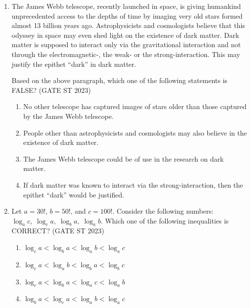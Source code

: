 \documentclass[journal]{IEEEtran}
\begin{document}
\begin{enumerate}[label=\textbf{Q.\arabic*.}, start=1, align=left, itemsep=2em]
\item The James Webb telescope, recently launched in space, is giving humankind unprecedented access to the depths of time by imaging very old stars formed almost 13 billion years ago. Astrophysicists and cosmologists believe that this odyssey in space may even shed light on the existence of dark matter. Dark matter is supposed to interact only via the gravitational interaction and not through the electromagnetic-, the weak- or the strong-interaction. This may justify the epithet ``dark'' in dark matter.

Based on the above paragraph, which one of the following statements is FALSE? \hfill(GATE ST 2023)

\begin{enumerate}
    \item No other telescope has captured images of stars older than those captured by the James Webb telescope.
    \item People other than astrophysicists and cosmologists may also believe in the existence of dark matter.
    \item The James Webb telescope could be of use in the research on dark matter.
    \item If dark matter was known to interact via the strong-interaction, then the epithet ``dark'' would be justified.
\end{enumerate}

\item Let $a = 30!$, $b = 50!$, and $c = 100!$. Consider the following numbers:
$\log_a c,\; \log_c a,\; \log_b a,\; \log_a b$.\newline
Which one of the following inequalities is CORRECT? \hfill(GATE ST 2023)

\begin{enumerate}
    \item $\log_c a < \log_b a < \log_a b < \log_a c$
    \item $\log_c a < \log_a b < \log_b a < \log_b c$
    \item $\log_c a < \log_b a < \log_a c < \log_a b$
    \item $\log_b a < \log_c a < \log_a b < \log_a c$
\end{enumerate}


\end{enumerate}
\end{document}

